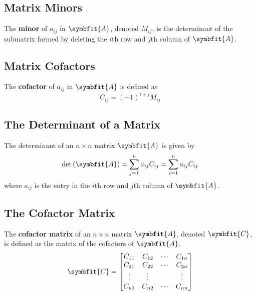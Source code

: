\documentclass{article}
\begin{document}
\subsection{Matrix Minors}
\begin{definition}
    The \textbf{minor} of \(a_{ij}\) in \(\symbfit{A}\), denoted
    \(M_{ij}\), is the determinant of the submatrix formed by deleting
    the \(i\)th row and \(j\)th column of \(\symbfit{A}\).
\end{definition}
\subsection{Matrix Cofactors}
\begin{definition}
    The \textbf{cofactor} of \(a_{ij}\) in \(\symbfit{A}\) is defined as
    \begin{equation*}
        C_{ij} = \left( -1 \right)^{i+j} M_{ij}
    \end{equation*}
\end{definition}
\subsection{The Determinant of a Matrix}
\begin{theorem}
    The determinant of an \(n\times n\) matrix \(\symbfit{A}\) is given
    by
    \begin{equation*}
        \det{\left( \symbfit{A} \right)} = \sum_{j=1}^n a_{ij}C_{ij} = \sum_{i=1}^n a_{ij}C_{ij}
    \end{equation*}
    where \(a_{ij}\) is the entry in the \(i\)th row and \(j\)th column
    of \(\symbfit{A}\).
\end{theorem}
\subsection{The Cofactor Matrix}
\begin{definition}
    The \textbf{cofactor matrix} of an \(n\times n\) matrix
    \(\symbfit{A}\), denoted \(\symbfit{C}\), is defined as the matrix
    of the cofactors of \(\symbfit{A}\).
    \begin{equation*}
        \symbfit{C} =
        \begin{bmatrix}
            C_{11} & C_{12} & \cdots & C_{1n} \\
            C_{21} & C_{22} & \cdots & C_{2n} \\
            \vdots & \vdots &        & \vdots \\
            C_{n1} & C_{n2} & \cdots & C_{nn}
        \end{bmatrix}
    \end{equation*}
\end{definition}
\end{document}
